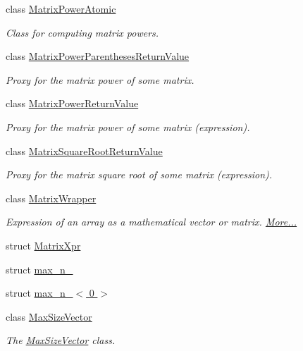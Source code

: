 \begin{DoxyCompactItemize}
class \hyperlink{class_eigen_1_1_matrix_power_atomic}{Matrix\+Power\+Atomic}
\begin{DoxyCompactList}\small\item\em Class for computing matrix powers. \end{DoxyCompactList}\item 
class \hyperlink{class_eigen_1_1_matrix_power_parentheses_return_value}{Matrix\+Power\+Parentheses\+Return\+Value}
\begin{DoxyCompactList}\small\item\em Proxy for the matrix power of some matrix. \end{DoxyCompactList}\item 
class \hyperlink{class_eigen_1_1_matrix_power_return_value}{Matrix\+Power\+Return\+Value}
\begin{DoxyCompactList}\small\item\em Proxy for the matrix power of some matrix (expression). \end{DoxyCompactList}\item 
class \hyperlink{class_eigen_1_1_matrix_square_root_return_value}{Matrix\+Square\+Root\+Return\+Value}
\begin{DoxyCompactList}\small\item\em Proxy for the matrix square root of some matrix (expression). \end{DoxyCompactList}\item 
class \hyperlink{group___core___module_class_eigen_1_1_matrix_wrapper}{Matrix\+Wrapper}
\begin{DoxyCompactList}\small\item\em Expression of an array as a mathematical vector or matrix.  \hyperlink{group___core___module_class_eigen_1_1_matrix_wrapper}{More...}\end{DoxyCompactList}\item 
struct \hyperlink{struct_eigen_1_1_matrix_xpr}{Matrix\+Xpr}
\item 
struct \hyperlink{struct_eigen_1_1max__n__1}{max\+\_\+n\+\_}
\item 
struct \hyperlink{struct_eigen_1_1max__n__1_3_010_01_4}{max\+\_\+n\+\_$<$ 0 $>$}
\item 
class \hyperlink{class_eigen_1_1_max_size_vector}{Max\+Size\+Vector}
\begin{DoxyCompactList}\small\item\em The \hyperlink{class_eigen_1_1_max_size_vector}{Max\+Size\+Vector} class. \end{DoxyCompactList}\item 

\end{DoxyCompactItemize}
